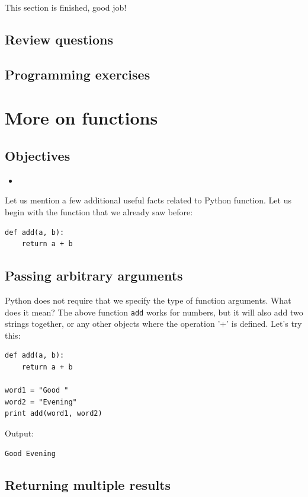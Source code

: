 \noindent
This section is finished, good job!

\subsection{Review questions}

\subsection{Programming exercises}


\section{More on functions}

\subsection{Objectives}

\begin{itemize}
\item
\end{itemize}

Let us mention a few additional useful facts related to 
Python function. Let us begin with the function that we already saw
before:

\begin{verbatim}
def add(a, b):
    return a + b
\end{verbatim}

\subsection{Passing arbitrary arguments}

Python does not require that we specify the type of function arguments. 
What does it mean? The above function {\tt add} works for 
numbers, but it will also add two strings together, or any other 
objects where the operation '+' is defined. Let's try this:

\begin{verbatim}
def add(a, b):
    return a + b

word1 = "Good "
word2 = "Evening"
print add(word1, word2)
\end{verbatim}
Output:

\begin{verbatim}
Good Evening
\end{verbatim}

\subsection{Returning multiple results}

